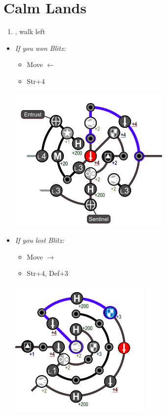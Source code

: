 \chapter{Calm Lands}

\begin{enumerate}
  \item \sd, walk left
\end{enumerate}
\begin{spheregrid}
  \begin{itemize}
  \yunaf
  \item \textit{If you won Blitz:}
  \begin{itemize}
  \item Move $\leftarrow$
  \item Str+4
  \end{itemize}
  \includegraphics[width=.5\columnwidth]{graphics/yuna_blitz_win_2}
  \item \textit{If you lost Blitz:}
  \begin{itemize}
	\item Move $\rightarrow$
  	\item Str+4, Def+3
	\end{itemize}
  \includegraphics[width=.5\columnwidth]{graphics/yuna_blitz_loss_2}
\end{itemize}
\end{spheregrid}
